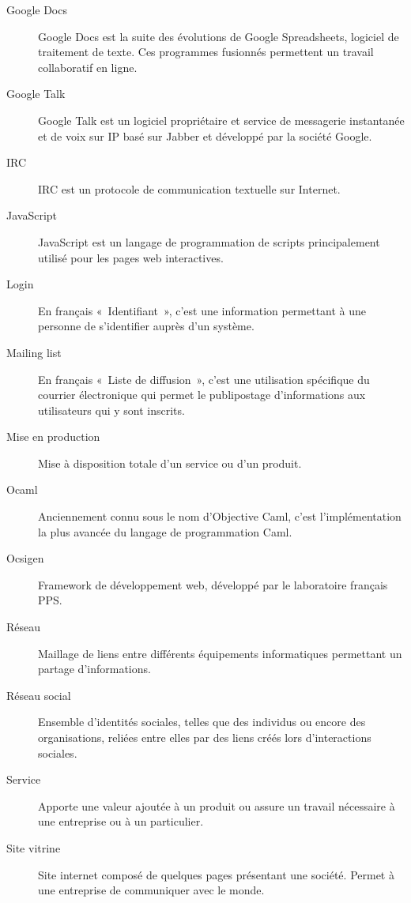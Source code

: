 \documentclass{life-fr}
\begin{document}
\begin{description}
\item[Google Docs]
Google Docs est la suite des évolutions de Google Spreadsheets, logiciel de traitement de texte. Ces programmes fusionnés permettent un travail collaboratif en ligne.

\item[Google Talk]
Google Talk est un logiciel propriétaire et service de messagerie instantanée et de voix sur IP basé sur Jabber et développé par la société Google.

\item[IRC]
IRC est un protocole de communication textuelle sur Internet.

\item[JavaScript]
JavaScript est un langage de programmation de scripts principalement utilisé pour les pages web interactives.

\item[Login]
En français «~Identifiant~», c'est une information permettant à une personne de s'identifier auprès d'un système.

\item[Mailing list]
En français «~Liste de diffusion~», c'est une utilisation spécifique du courrier électronique qui permet le publipostage d'informations aux utilisateurs qui y sont inscrits.

\item[Mise en production]
Mise à disposition totale d’un service ou d’un produit.

\item[Ocaml]
Anciennement connu sous le nom d'Objective Caml, c’est l'implémentation la plus avancée du langage de programmation Caml.

\item[Ocsigen]
Framework de développement web, développé par le laboratoire français PPS.

\item[Réseau]
Maillage de liens entre différents équipements informatiques permettant un partage d’informations.

\item[Réseau social]
Ensemble d'identités sociales, telles que des individus ou encore des organisations, reliées entre elles par des liens créés lors d’interactions sociales.

\item[Service]
Apporte une valeur ajoutée à un produit ou assure un travail nécessaire à une entreprise ou à un particulier.

\item[Site vitrine]
Site internet composé de quelques pages présentant une société. Permet à une entreprise de communiquer avec le monde.


\end{description}
\end{document}
